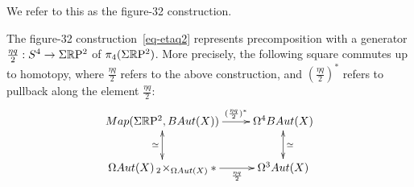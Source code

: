 \documentclass{amsart}
\begin{document}
\nid We refer to this as the figure-32 construction.

\begin{lemma} \label{lemma-etaq2}
The figure-32 construction~\eqref{eq-etaq2} represents precomposition with a generator $\frac{\eta q}{2}: S^4 \rightarrow \Sigma \mathbb R \mathrm{P}^2$ of $\pi_4(\Sigma \mathbb R \mathrm{P}^2)$.  More precisely, the following square commutes up to homotopy, where $\frac{\eta q}{2}$ refers to the above construction, and $(\frac{\eta q}{2})^\ast$ refers to pullback along the element $\frac{\eta q}{2}$:
\begin{equation} \nn
\xymatrix{
\Map(\Sigma \RP^2,B\Aut(X)) \ar[r]^-{(\frac{\eta q}{2})^\ast} \ar@{<->}[d]_{\simeq} & \Omega^4 B\Aut(X)  \ar@{<->}[d]^{\simeq} \\
\Omega\Aut(X) \,_2\! \times_{\Omega \Aut(X)} \ast \ar[r]_-{\frac{\eta q}{2}} & \Omega^3 \Aut(X)
}
\end{equation}
\end{lemma}
\end{document}
